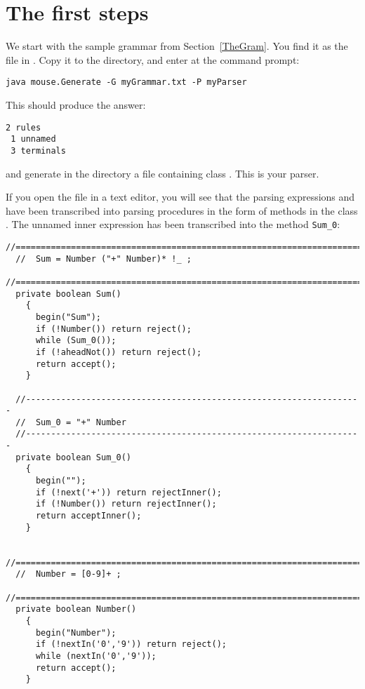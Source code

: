\newpage

\section{The first steps}


We start with the sample grammar from Section~\ref{TheGram}.
You find it as the file  in .
Copy it to the  directory,
and enter at the command prompt:

\small
\begin{Verbatim}[samepage=true,xleftmargin=15mm,baselinestretch=0.8]
 java mouse.Generate -G myGrammar.txt -P myParser
\end{Verbatim}
\normalsize
%      
This should produce the answer: 
%      
\small
\begin{Verbatim}[samepage=true,xleftmargin=15mm,baselinestretch=0.8]
 2 rules
 1 unnamed
 3 terminals
\end{Verbatim}
\normalsize
%      
and generate in the  directory a file 
containing class .
This is your parser.

If you open the file in a text editor, you will see that the 
parsing expressions  and  have been transcribed
into parsing procedures in the form of methods in the class . 
The unnamed inner expression  has been transcribed
into the method \verb#Sum_0#:

\small
\begin{Verbatim}[frame=single,framesep=2mm,samepage=true,xleftmargin=15mm,xrightmargin=15mm,baselinestretch=0.8]
  //=====================================================================
  //  Sum = Number ("+" Number)* !_ ;
  //=====================================================================
  private boolean Sum()
    {
      begin("Sum");
      if (!Number()) return reject();
      while (Sum_0());
      if (!aheadNot()) return reject();
      return accept();
    }
  
  //-------------------------------------------------------------------
  //  Sum_0 = "+" Number
  //-------------------------------------------------------------------
  private boolean Sum_0()
    {
      begin("");
      if (!next('+')) return rejectInner();
      if (!Number()) return rejectInner();
      return acceptInner();
    }
  
  //=====================================================================
  //  Number = [0-9]+ ;
  //=====================================================================
  private boolean Number()
    {
      begin("Number");
      if (!nextIn('0','9')) return reject();
      while (nextIn('0','9'));
      return accept();
    }
\end{Verbatim}
\normalsize

